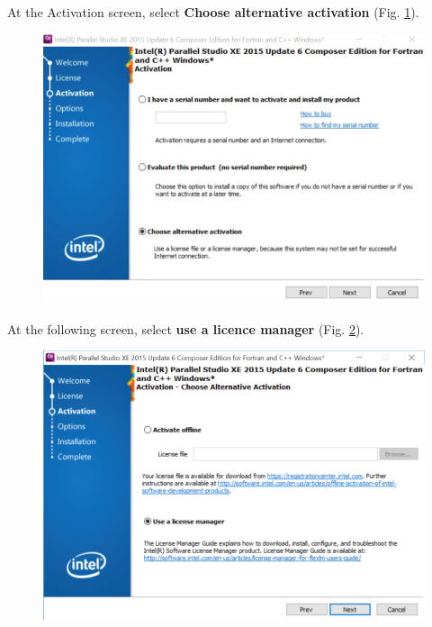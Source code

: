 \documentclass[10pt,a4paper,oneside]{article}
\begin{document}
At the Activation screen, select \textbf{Choose alternative activation} (Fig. \ref{fig:VS3}).
\begin{figure}[ht]
\centering
\includegraphics[scale=0.4]{VS3.png}
\caption{}
\label{fig:VS3}
\end{figure}
At the following screen, select \textbf{use a licence manager} (Fig. \ref{fig:VS4}).
\begin{figure}[ht]
\centering
\includegraphics[scale=0.4]{VS4.png}
\caption{}
\label{fig:VS4}
\end{figure}
\end{document}
